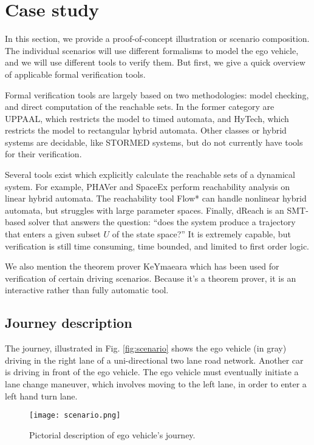 \section{Case study}
\label{caseStudy}
In this section, we provide a proof-of-concept illustration or scenario composition.
The individual scenarios will use different formalisms to model the ego vehicle, and we will use different tools to verify them.
But first, we give a quick overview of applicable formal verification tools.

Formal verification tools are largely based on two methodologies: model checking, and direct computation of the reachable sets. 
In the former category are UPPAAL, which restricts the model to timed automata, and HyTech, which restricts the model to rectangular hybrid automata. 
Other classes or hybrid systems are decidable, like STORMED systems, but do not currently have tools for their verification.

Several tools exist which explicitly calculate the reachable sets of a dynamical system.
For example, PHAVer and SpaceEx perform reachability analysis on linear hybrid automata. 
The reachability tool Flow* can handle nonlinear hybrid automata, but struggles with large parameter spaces. 
Finally, dReach is an SMT-based solver that answers the question: ``does the system produce a trajectory that enters a given subset $U$ of the state space?''
It is extremely capable, but verification is still time consuming, time bounded, and limited to first order logic. 

We also mention the theorem prover KeYmaeara which has been used for verification of certain driving scenarios.
Because it's a theorem prover, it is an interactive rather than fully automatic tool. 

\subsection{Journey description}
The journey, illustrated in Fig. \ref{fig:scenario} shows the ego vehicle (in gray) driving in the right lane of a uni-directional two lane road network. 
Another car is driving in front of the ego vehicle.
The ego vehicle must eventually initiate a lane change maneuver, which involves moving to the left lane, in order to enter a left hand turn lane.

\begin{figure}[tb]
	\centering
	\label{fig:scenario}
	\texttt{[image: scenario.png]}
	\caption{Pictorial description of ego vehicle's journey.}
	\label{fig:journey}
\end{figure}

